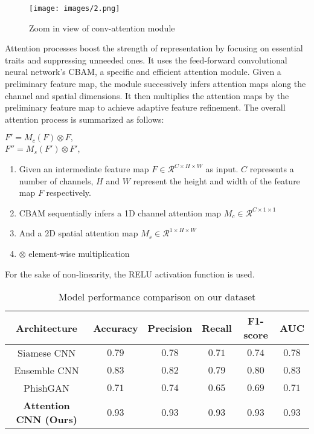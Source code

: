 \documentclass[letterpaper]{article} \usepackage{aaai22}  \usepackage{times}  \usepackage{helvet}  \usepackage{courier}  \usepackage[hyphens]{url}  \usepackage{graphicx} \urlstyle{rm} \def\UrlFont{\rm}  \usepackage{natbib}  \usepackage{caption} \DeclareCaptionStyle{ruled}{labelfont=normalfont,labelsep=colon,strut=off} \frenchspacing  \setlength{\pdfpagewidth}{8.5in}  \setlength{\pdfpageheight}{11in}  \usepackage{algorithm}
\begin{document}
\begin{figure*}[!ht]
  \texttt{[image: images/2.png]}
  \caption{Zoom in view of conv-attention module}
\end{figure*}

Attention processes boost the strength of representation by focusing on essential traits and suppressing unneeded ones. It uses the feed-forward convolutional neural network's CBAM, a specific and efficient attention module. Given a preliminary feature map, the module successively infers attention maps along the channel and spatial dimensions. It then multiplies the attention maps by the preliminary feature map to achieve adaptive feature refinement. The overall attention process is summarized as follows:


\begin{center}
$F'=M_c(F) \otimes F,$ \\
$F''=M_s(F') \otimes F'$,
\end{center}
\begin{enumerate}
    \item Given an intermediate feature map $ F \in \mathcal{R}^{C \times H \times W}$ as input. $C$ represents a number of channels, $H$ and $W$ represent the height and width of the feature map $F$ respectively. 
    \item CBAM sequentially infers a 1D channel attention map $M_c \in \mathcal{R}^{C \times 1 \times 1 }$ 
    \item And a 2D spatial attention map $M_s \in \mathcal{R}^{1 \times H \times W}$ 
    \item $\otimes$ element-wise multiplication
\end{enumerate}

For the sake of non-linearity, the RELU activation function is used. 

\begin{table*}[!ht]
    \centering
    \begin{tabular}{|c|c|c|c|c|c|} \hline
         \textbf{Architecture}& \textbf{Accuracy} & \textbf{Precision} & \textbf{Recall} & \textbf{F1-score} & \textbf{AUC}\\ \hline
         Siamese CNN\cite{woodbridge2018detecting} & $0.79$ & $0.78$ & $0.71$ & $0.74$ & $0.78$\\ \hline
         Ensemble CNN\cite{majumder2020convolutional} & $0.83$ & $0.82$ & $0.79$ & $0.80$ & $0.83$\\ \hline
         PhishGAN\cite{sern2020phishgan} & $0.71$ & $0.74$ & $0.65$ & $0.69$ & $0.71$\\ \hline
         \textbf{Attention CNN (Ours)} & \textbf{$0.93$} & \textbf{$0.93$} & \textbf{$0.93$} & \textbf{$0.93$} & \textbf{$0.93$}\\ \hline
    \end{tabular}
    \caption{Model performance comparison on our dataset}
    \label{tab:results}
\end{table*} 
\end{document}
